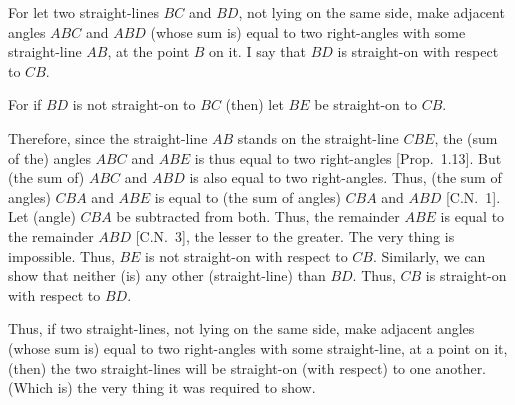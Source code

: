\begin{Parallel}{}{}
{For let two
straight-lines $BC$ and $BD$, not lying on the same side,  make adjacent angles $ABC$ and $ABD$ (whose sum is)
equal to two right-angles with some straight-line $AB$, at the point $B$ on it. I say
that $BD$ is  straight-on with respect to $CB$.

\epsfysize=1.8in
\centerline{}

For if $BD$ is not straight-on to $BC$ (then) let $BE$ be straight-on to $CB$.

Therefore, since the straight-line $AB$ stands on the straight-line $CBE$, the (sum of the) angles $ABC$ and $ABE$ is thus equal to two right-angles [Prop.~1.13]. But (the sum of) $ABC$ and $ABD$ is also equal to two right-angles.
Thus, 
(the sum of angles) $CBA$ and $ABE$ is equal to (the sum of angles) $CBA$ and $ABD$ [C.N.~1]. Let (angle)
$CBA$ be subtracted from both. Thus, the remainder $ABE$ is
equal to the remainder $ABD$ [C.N.~3], the lesser to the greater. The very thing is impossible. Thus, $BE$ is not straight-on with respect to $CB$. Similarly, we can
show that neither (is) any other (straight-line)   than $BD$.
Thus, $CB$ is straight-on with respect to $BD$.

Thus, if two straight-lines, not lying on the same side,  make adjacent angles (whose sum is) equal to two right-angles with some straight-line, at a point on it, (then) the two straight-lines
will be straight-on (with respect) to one another. (Which is) the very thing it
was required to show.}
\end{Parallel}

